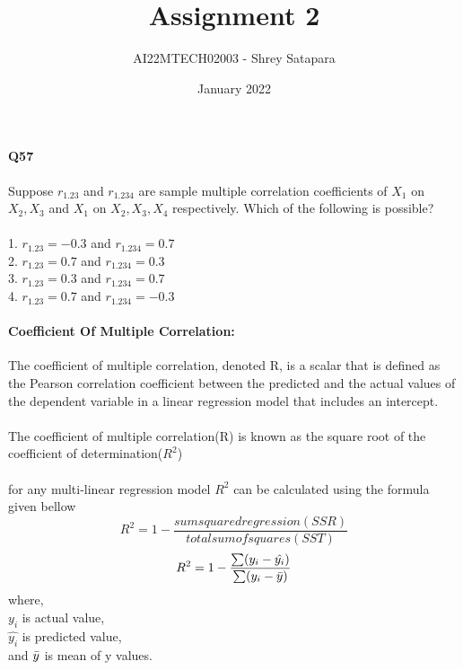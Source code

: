 \documentclass{article}
\title{Assignment 2}
\author{AI22MTECH02003 - Shrey Satapara}
\date{January 2022}
\begin{document}
\maketitle

\paragraph{Q57}
 Suppose \(r_{1.23}\) and \(r_{1.234}\) are sample multiple correlation coefficients of \(X_1\) on \(X_2,X_3\) and \(X_1\) on \(X_2,X_3,X_4\) respectively. Which of the following is possible?\\\\
1. \quad \(r_{1.23} = -0.3\) and \(r_{1.234} = 0.7\)\\
2. \quad \(r_{1.23} = 0.7\) and \(r_{1.234} = 0.3\)\\
3. \quad \(r_{1.23} = 0.3\) and \(r_{1.234} = 0.7\)\\
4. \quad \(r_{1.23} = 0.7\) and \(r_{1.234} = -0.3\)\\

\paragraph{Coefficient Of Multiple Correlation:}
The coefficient of multiple correlation, denoted R, is a scalar that is defined as the Pearson correlation coefficient between the predicted and the actual values of the dependent variable in a linear regression model that includes an intercept.
\\\\
The coefficient of multiple correlation(R) is known as the square root of the coefficient of determination(\(R^2\))
\\\\
for any multi-linear regression model \(R^2\) can be calculated using the formula given bellow\\
\begin{equation}
    R^2 = 1 - \frac{sum squared regression (SSR)}{total sum of squares (SST)}
\end{equation}\begin{equation}
    R^2 = 1 - \frac{\sum(y_i - \hat{y_i})}{\sum(y_i - \Bar{y})}\\
\end{equation}
where,\\
\hspace*{1em} \quad \quad    \(y_i\) is actual value,\\
\hspace*{1em} \quad \quad    \(\hat{y_i}\) is predicted value,\\
\hspace*{1em} \quad \quad    and \(\Bar{y}\) is mean of y values.
\end{document}
